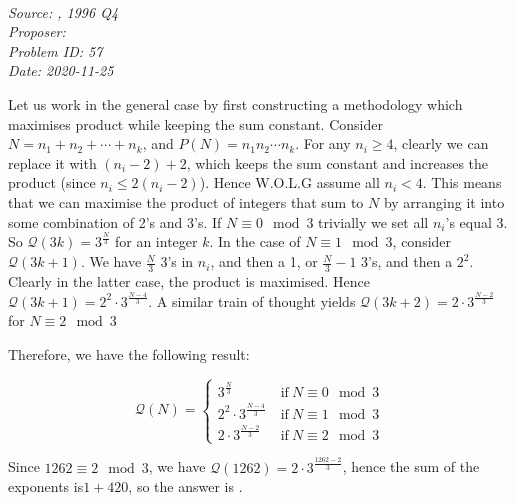 \SSbreak\\
\emph{Source: \Cstepiii, 1996 Q4}\\
\emph{Proposer: \Pss}\\
\emph{Problem ID: 57}\\
\emph{Date: 2020-11-25}\\
\SSbreak

\bigskip

\begin{solution}\hfil\medskip

    Let us work in the general case by first constructing a methodology which maximises product while keeping the sum constant. Consider \(N=n_1+n_2+\cdots+n_k\), and \(P(N)=n_1n_2\cdots n_k\). For any \(n_i\geq 4\), clearly we can replace it with \((n_i-2)+2\), which keeps the sum constant and increases the product (since \(n_i\leq 2(n_i-2)\)). Hence W.O.L.G assume all \(n_i<4\). This means that we can maximise the product of integers that sum to \(N\) by arranging it into some combination of 2's and 3's. If \(N\equiv0\mod{3}\) trivially we set all \(n_i\)'s equal 3. So \(\mathcal{Q}(3k)=3^{\frac{N}{3}}\) for an integer \(k\). In the case of \(N\equiv 1\mod{3}\), consider\(\mathcal{Q}(3k+1)\). We have \(\frac{N}{3}\) 3's in \(n_i\), and then a 1, or \(\frac{N}{3}-1\) 3's, and then a \(2^2\). Clearly in the latter case, the product is maximised. Hence \(\mathcal{Q}(3k+1)=2^2\cdot3^{\frac{N-4}{3}}\). A similar train of thought yields \(\mathcal{Q}(3k+2)=2\cdot3^{\frac{N-2}{3}}\) for \(N\equiv 2\mod{3}\)\medskip
    
    Therefore, we have the following result:
    
    \begin{equation*}
        \mathcal{Q}(N)=
        \begin{cases}
            3^{\frac{N}{3}}\ &\mathrm{if}\ N \equiv 0 \mod 3\\
            2^2\cdot3^{\frac{N-4}{3}}\ &\mathrm{if}\ N \equiv 1 \mod 3\\
            2\cdot3^{\frac{N-2}{3}}\ &\mathrm{if}\ N \equiv 2 \mod 3
        \end{cases}
    \end{equation*}
    
    Since \(1262\equiv 2\mod 3\), we have \(\mathcal{Q}(1262)=2\cdot3^{\frac{1262-2}{3}}\), hence the sum of the exponents is\(1+420\), so the answer is .
\end{solution}\bigskip